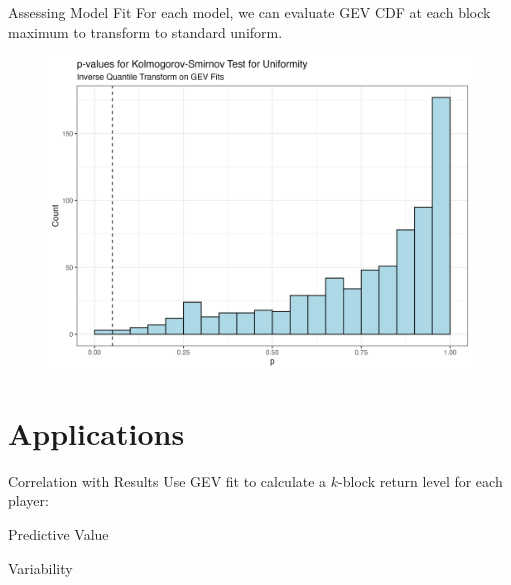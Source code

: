 \documentclass{beamer}
\begin{document}
\begin{frame}{Assessing Model Fit}
    For each model, we can evaluate GEV CDF at each block maximum to transform to standard uniform.
    \begin{figure}
        \centering
        \includegraphics[width=0.85\linewidth]{plots/kstest.png}
    \end{figure}
\end{frame}

\section{Applications}
\begin{frame}{Correlation with Results}
    Use GEV fit to calculate a $k$-block return level for each player:
\end{frame}

\begin{frame}{Predictive Value}
    
\end{frame}

\begin{frame}{Variability}
    
\end{frame}

\begin{frame}[allowframebreaks]
    \printbibliography
\end{frame}
\end{document}
